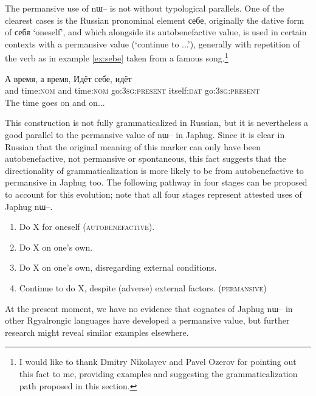 \documentclass[oldfontcommands,oneside,a4paper,11pt]{article}
\newcommand{\ipa}[1]{{\phon \mbox{#1}}} %
\begin{document}
%

The permansive use of \ipa{nɯ--} is not without typological parallels. One of the clearest cases is the Russian pronominal element \ipa{себе}, originally the dative form of \ipa{себя} `oneself', and which alongside its autobenefactive value,  is used in certain contexts with a permansive value (`continue to ...'), generally with repetition of the verb as in example \ref{ex:sebe} taken from a famous song.\footnote{I would like to thank Dmitry Nikolayev and Pavel Ozerov for pointing out this fact to me, providing examples and suggesting the grammaticalization path proposed in this section.}
 
\begin{exe}
 \ex \label{ex:sebe}
 \gll
\ipa{А} 	\ipa{время,} 	\ipa{а} 	\ipa{время,} 	\ipa{Идёт} 	\ipa{себе,} 	\ipa{идёт} \\
 and time:\textsc{nom}  and time:\textsc{nom}  go:\textsc{3sg:present} itself:\textsc{dat} go:\textsc{3sg:present} \\
\glt The time goes on and on...
 \end{exe}

This construction is not fully grammaticalized in Russian, but it is nevertheless a good parallel to the permansive value of \ipa{nɯ--} in Japhug. Since it is clear in Russian that the original meaning of this marker can only have been autobenefactive, not permansive or spontaneous, this fact suggests that the directionality of grammaticalization is more likely to be from autobenefactive to permansive in Japhug too. The following pathway in four stages can be proposed to account for this evolution; note that all four stages represent attested uses of Japhug \ipa{nɯ--}.

\begin{enumerate}
\item Do X for oneself (\textsc{autobenefactive}).  
\item Do X on one's own.
\item Do X on one's own, disregarding external conditions.
\item Continue to do X, despite (adverse) external factors. (\textsc{permansive})
\end{enumerate}
 
At the present moment, we have no evidence that cognates of Japhug \ipa{nɯ--} in other Rgyalrongic languages have developed a permansive value, but further research might reveal similar examples elsewhere.
\end{document}
